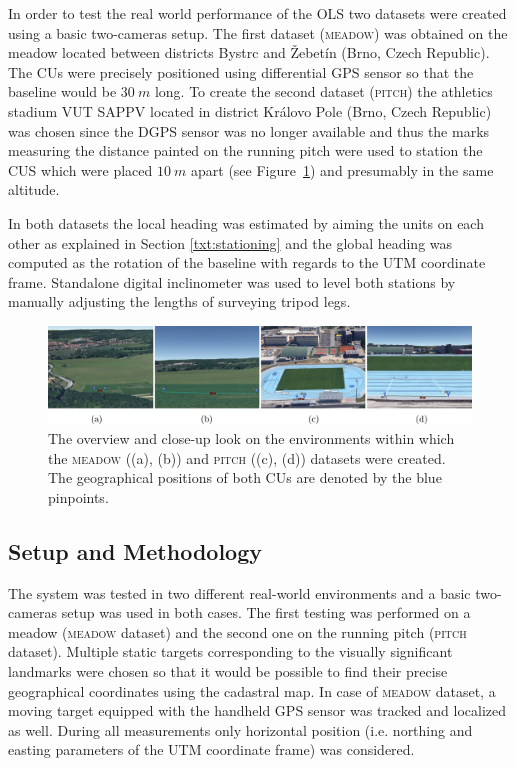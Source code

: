 In order to test the real world performance of the OLS two datasets were created using a basic two-cameras setup. The first dataset (\textsc{meadow}) was obtained on the meadow located between districts Bystrc and Žebetín (Brno, Czech Republic). The CUs were precisely positioned using differential GPS sensor so that the baseline would be $30~m$ long. To create the second dataset (\textsc{pitch}) the athletics stadium VUT SAPPV located in district Královo Pole (Brno, Czech Republic) was chosen since the DGPS sensor was no longer available and thus the marks measuring the distance painted on the running pitch were used to station the CUS which were placed $10~m$ apart (see Figure~\ref{fig:dataset_zebetin_vut}) and presumably in the same altitude.

In both datasets the local heading was estimated by aiming the units on each other as explained in Section \ref{txt:stationing} and the global heading was computed as the rotation of the baseline with regards to the UTM coordinate frame. Standalone digital inclinometer was used to level both stations by manually adjusting the lengths of surveying tripod legs.

\begin{figure}[htb]\centering
	\centering
	\includegraphics[width=0.98\linewidth]{fig/dataset_zebetin_vut.png}
	\caption{The overview and close-up look on the environments within which the \textsc{meadow} ((a), (b)) and \textsc{pitch} ((c), (d)) datasets were created. The geographical positions of both CUs are denoted by the blue pinpoints.}
	\label{fig:dataset_zebetin_vut}
\end{figure}

\subsection{Setup and Methodology} \label{txt:setup_and_methodology}

The system was tested in two different real-world environments and a basic two-cameras setup was used in both cases. The first testing was performed on a meadow (\textsc{meadow} dataset) and the second one on the running pitch (\textsc{pitch} dataset). Multiple static targets corresponding to the visually significant landmarks were chosen so that it would be possible to find their precise geographical coordinates using the cadastral map. In case of \textsc{meadow} dataset, a moving target equipped with the handheld GPS sensor was tracked and localized as well. During all measurements only horizontal position (i.e. northing and easting parameters of the UTM coordinate frame) was considered.

